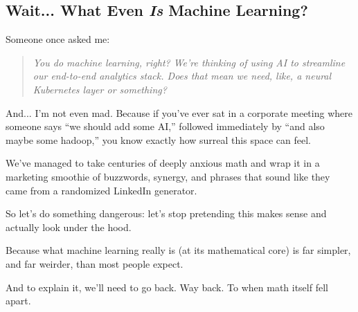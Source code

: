 \subsection{Wait... What Even \textit{Is} Machine Learning?}

Someone once asked me:

\begin{quote}
\textit{You do machine learning, right? We’re thinking of using AI to streamline our end-to-end analytics stack. Does that mean we need, like, a neural Kubernetes layer or something?}
\end{quote}

And... I'm not even mad. Because if you’ve ever sat in a corporate meeting where someone says “we should add some AI,” followed immediately by “and also maybe some hadoop,” you know exactly how surreal this space can feel.

We’ve managed to take centuries of deeply anxious math and wrap it in a marketing smoothie of buzzwords, synergy, and phrases that sound like they came from a randomized LinkedIn generator.

So let’s do something dangerous: let’s stop pretending this makes sense and actually look under the hood.

Because what machine learning really is (at its mathematical core) is far simpler, and far weirder, than most people expect.

And to explain it, we’ll need to go back. Way back. To when math itself fell apart.

